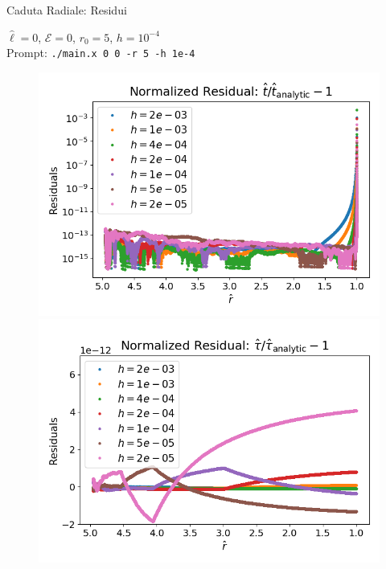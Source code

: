 \begin{frame}{Caduta Radiale: Residui}

    $\hat \ell = 0$, $\mathcal E = 0$, $r_0 = 5$, $h = 10^{-4}$ \\
    Prompt: \texttt{./main.x 0 0 -r 5 -h 1e-4}

    \begin{figure}[h]
        \begin{minipage}{0.48\textwidth}
            \centering
            \includegraphics[width=\textwidth]{Figures/ch2/t_res_multi.png}
        \end{minipage}
        \hspace{0.015 \textwidth}
        \begin{minipage}{0.48\textwidth}
            \centering
            \includegraphics[width=\textwidth]{Figures/ch2/tau_res_multi.png}
        \end{minipage}
    \end{figure}

\end{frame}

